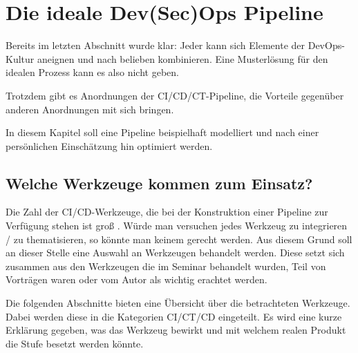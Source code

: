 \chapter{Die \glqq ideale\grqq{} Dev(Sec)Ops Pipeline}

Bereits im letzten Abschnitt wurde klar: Jeder kann sich Elemente der DevOps-Kultur aneignen und nach belieben kombinieren. 
Eine \glqq Musterlösung\grqq{} für den idealen Prozess kann es also nicht geben. 

Trotzdem gibt es Anordnungen der CI/CD/CT-Pipeline, die Vorteile gegenüber anderen Anordnungen mit sich bringen. 

In diesem Kapitel soll eine Pipeline beispielhaft modelliert und nach einer persönlichen Einschätzung hin optimiert werden.

\section{Welche Werkzeuge kommen zum Einsatz?}\label{sec:welchetools}

Die Zahl der CI/CD-Werkzeuge, die bei der Konstruktion einer Pipeline zur Verfügung stehen ist groß \cite{xebialabsXebiaLabsPrasentiertPeriodensystem2018} \cite{digital.aiPeriodicTableDevOps}. Würde man versuchen jedes Werkzeug zu integrieren / zu thematisieren, so könnte man keinem gerecht werden.
Aus diesem Grund soll an dieser Stelle eine Auswahl an Werkzeugen behandelt werden. Diese setzt sich zusammen aus den Werkzeugen die im Seminar behandelt wurden, Teil von Vorträgen waren oder vom Autor als wichtig erachtet werden.

Die folgenden Abschnitte bieten eine Übersicht über die betrachteten Werkzeuge. Dabei werden diese in die Kategorien CI/CT/CD eingeteilt. Es wird eine kurze Erklärung gegeben, was das Werkzeug bewirkt und mit welchem realen Produkt die Stufe besetzt werden könnte.

